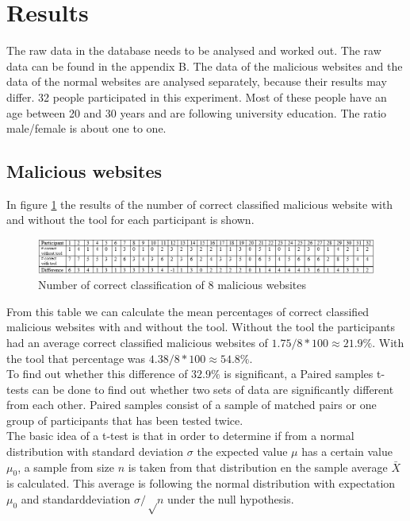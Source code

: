 \documentclass[twoside,openright,notitlepage]{uva-bachelor-thesis}
\begin{document}
\FloatBarrier
\section{Results}
The raw data in the database needs to be analysed and worked out. The raw data can be found in the appendix B. The data of the malicious websites and the data of the normal websites are analysed separately, because their results may differ. 32 people participated in this experiment. Most of these people have an age between 20 and 30 years and are following university education. The ratio male/female is about one to one.\\

\subsection{Malicious websites}
In figure \ref{fig:tabel_bad} the results of the number of correct classified malicious website with and without the tool for each participant is shown.

\begin{figure}[h!]
    \centering
    \includegraphics[width=1.2\textwidth, center]{img/tabel_bad.PNG}
    \caption{Number of correct classification of 8 malicious websites}
    \label{fig:tabel_bad}
\end{figure}

From this table we can calculate the mean percentages of correct classified malicious websites with and without the tool. Without the tool the participants had an average correct classified malicious websites of $1.75/8 * 100 \approx 21.9 \%$. With the tool that percentage was $4.38/8 *100 \approx 54.8 \%$.\\

To find out whether this difference of $32.9 \%$ is significant, a Paired samples t-tests can be done to find out whether two sets of data are significantly different from each other. Paired samples consist of a sample of matched pairs or one group of participants that has been tested twice.\\

The basic idea of a t-test is that in order to determine if from a normal distribution with standard deviation $σ$ the expected value $μ$ has a certain value $μ_0$, a sample from size $n$ is taken from that distribution en the sample average $\bar{X}$ is calculated. This average is following the normal distribution with expectation $μ_0$ and standarddeviation $σ/√n$ under the null hypothesis.
\end{document}
